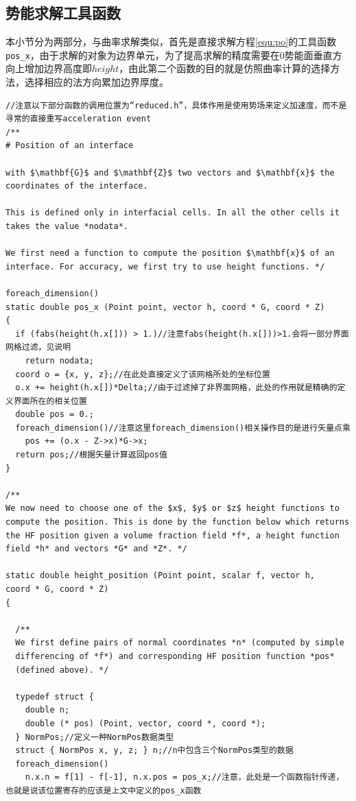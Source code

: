 \documentclass[lang=cn,11pt,a4paper]{elegantpaper}
\begin{document}
\subsection{势能求解工具函数}
本小节分为两部分，与曲率求解类似，首先是直接求解方程\ref{equ:po}的工具函数\texttt{pos_x}，由于求解的对象为边界单元，为了提高求解的精度需要在0势能面垂直方向上增加边界高度即$height$，由此第二个函数的目的就是仿照曲率计算的选择方法，选择相应的法方向累加边界厚度。 
\begin{verbatim}
//注意以下部分函数的调用位置为“reduced.h”，具体作用是使用势场来定义加速度，而不是寻常的直接重写acceleration event
/**
# Position of an interface

with $\mathbf{G}$ and $\mathbf{Z}$ two vectors and $\mathbf{x}$ the
coordinates of the interface.

This is defined only in interfacial cells. In all the other cells it
takes the value *nodata*.

We first need a function to compute the position $\mathbf{x}$ of an
interface. For accuracy, we first try to use height functions. */

foreach_dimension()
static double pos_x (Point point, vector h, coord * G, coord * Z)
{
  if (fabs(height(h.x[])) > 1.)//注意fabs(height(h.x[]))>1.会将一部分界面网格过滤，见说明
    return nodata;
  coord o = {x, y, z};//在此处直接定义了该网格所处的坐标位置
  o.x += height(h.x[])*Delta;//由于过滤掉了非界面网格，此处的作用就是精确的定义界面所在的相关位置
  double pos = 0.;
  foreach_dimension()//注意这里foreach_dimension()相关操作目的是进行矢量点乘
    pos += (o.x - Z->x)*G->x;
  return pos;//根据矢量计算返回pos值
}

/**
We now need to choose one of the $x$, $y$ or $z$ height functions to
compute the position. This is done by the function below which returns
the HF position given a volume fraction field *f*, a height function
field *h* and vectors *G* and *Z*. */

static double height_position (Point point, scalar f, vector h,
coord * G, coord * Z)
{

  /**
  We first define pairs of normal coordinates *n* (computed by simple
  differencing of *f*) and corresponding HF position function *pos*
  (defined above). */

  typedef struct {
    double n;
    double (* pos) (Point, vector, coord *, coord *);
  } NormPos;//定义一种NormPos数据类型
  struct { NormPos x, y, z; } n;//n中包含三个NormPos类型的数据
  foreach_dimension()
    n.x.n = f[1] - f[-1], n.x.pos = pos_x;//注意，此处是一个函数指针传递，也就是说该位置寄存的应该是上文中定义的pos_x函数
  

\end{verbatim}
\end{document}
